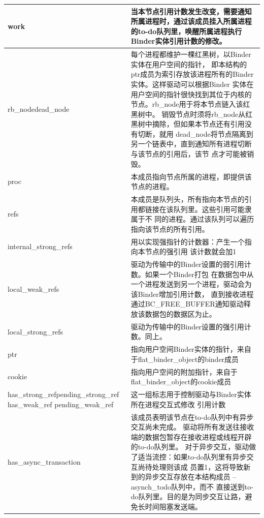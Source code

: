 \documentclass[a4paper,11pt]{article}
\begin{document}
\begin{longtable}{|p{}|p{}|}\hline
    work& 当本节点引用计数发生改变，需要通知所属进程时，通过该成员挂入所属进程的to-do队列里，唤醒所属进程执行Binder实体引用计数的修改。\\\hline
    rb_node\newline dead_node & 每个进程都维护一棵红黑树，以Binder实体在用户空间的指针，
    即本结构的ptr成员为索引存放该进程所有的Binder实体。这样驱动可以根据Binder
    实体在用户空间的指针很快找到其位于内核的节点。rb_node用于将本节点链入该红黑树中。
    销毁节点时须将rb_node从红黑树中摘除，但如果本节点还有引用没有切断，就用
    dead_node将节点隔离到另一个链表中，直到通知所有进程切断与该节点的引用后，该节
    点才可能被销毁。 \\\hline
    proc & 本成员指向节点所属的进程，即提供该节点的进程。\\\hline
    refs & 本成员是队列头，所有指向本节点的引用都链接在该队列里。这些引用可能隶属于不
    同的进程。通过该队列可以遍历指向该节点的所有引用。\\\hline
    internal_strong_refs & 用以实现强指针的计数器：产生一个指向本节点的强引用
    该计数就会加1 \\\hline
     local_weak_refs & 驱动为传输中的Binder设置的弱引用计数。如果一个Binder打包
     在数据包中从一个进程发送到另一个进程，驱动会为该Binder增加引用计数，
     直到接收进程通过BC_FREE_BUFFER通知驱动释放该数据包的数据区为止。\\\hline
      local_strong_refs & 驱动为传输中的Binder设置的强引用计数。同上。\\\hline
      ptr & 指向用户空间Binder实体的指针，来自于flat_binder_object的binder成员
      \\\hline
      cookie & 指向用户空间的附加指针，来自于flat_binder_object的cookie成员
      \\\hline
      has_strong_ref\newline pending_strong_ref \newline has_weak_ref \newline
      pending_weak_ref & 这一组标志用于控制驱动与Binder实体所在进程交互式修改
      引用计数 \\\hline
      has_async_transaction & 该成员表明该节点在to-do队列中有异步交互尚未完成。
      驱动将所有发送往接收端的数据包暂存在接收进程或线程开辟的to-do队列里。
      对于异步交互，驱动做了适当流控：如果to-do队列里有异步交互尚待处理则该成
      员置1，这将导致新到的异步交互存放在本结构成员 – asynch_todo队列中，而不
      直接送到to-do队列里。目的是为同步交互让路，避免长时间阻塞发送端。

\end{longtable}
\end{document}
